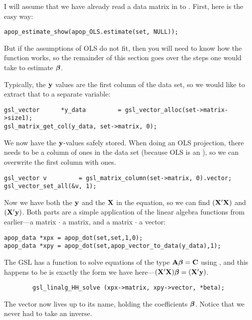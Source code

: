I will assume that we have already read a data matrix in to . First, here is the easy way:
\begin{lstlisting}
apop_estimate_show(apop_OLS.estimate(set, NULL));
\end{lstlisting}
But if the assumptions of OLS do not fit, then you will need to know how
the  function works, so the remainder of this
section goes over the steps one would take to estimate ${\mbox{\boldmath$\beta$}}$.  

Typically, the ${\bf y}$
values are the first column of the data set, so we would like to extract that to a separate variable:
\begin{lstlisting}
gsl_vector      *y_data         = gsl_vector_alloc(set->matrix->size1);
gsl_matrix_get_col(y_data, set->matrix, 0);
\end{lstlisting}

We now have the ${\bf y}$-values safely stored.  When doing an OLS projection,
there needs to be a column of ones in the data set (because OLS is an
), so we can overwrite the first column
with ones. 
\begin{lstlisting}
gsl_vector v         = gsl_matrix_column(set->matrix, 0).vector;
gsl_vector_set_all(&v, 1);  
\end{lstlisting}


Now we have both the ${\bf y}$ and the ${\bf X}$ in the equation, so we can find $({\bf X}'{\bf X})$ and $({\bf X}'{\bf y})$.
Both parts are a
simple application of the linear algebra functions from earlier---a matrix $\cdot$ a matrix, and a matrix $\cdot$ a vector:
\begin{lstlisting}
apop_data *xpx = apop_dot(set,set,1,0);
apop_data *xpy = apop_dot(set,apop_vector_to_data(y_data),1);
\end{lstlisting}

The GSL has a function to solve equations of the type ${\bf A} {\mbox{\boldmath$\beta$}} =
{\bf C}$ using , and this happens to be is exactly the form we have here---$({\bf X}'{\bf X}){\mbox{\boldmath$\beta$}} = ({\bf X}'{\bf y})$.  \label{ols}
\begin{lstlisting}
        gsl_linalg_HH_solve (xpx->matrix, xpy->vector, *beta);
\end{lstlisting}

The vector  now lives up to its name, holding the coefficients
${\mbox{\boldmath$\beta$}}$. Notice that we never had to take an inverse.  

